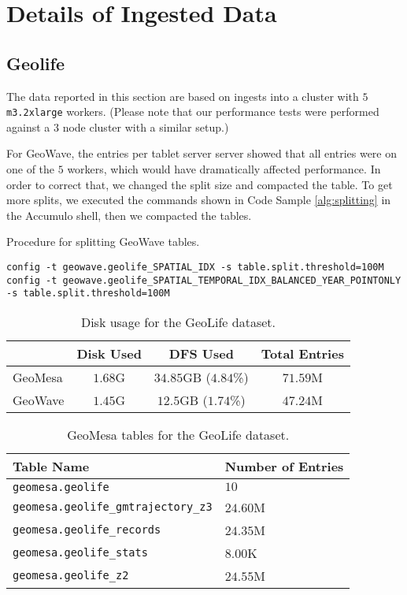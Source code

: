 \section{Details of Ingested Data}
\label{appendix:data}

\subsection{Geolife}

The data reported in this section are based on ingests into a cluster with $5$ \texttt{m3.2xlarge} workers.
(Please note that our performance tests were performed against a $3$ node cluster with a similar setup.)

For GeoWave, the entries per tablet server server showed that all entries were on one of the $5$ workers, which would have dramatically affected performance.
In order to correct that, we changed the split size and compacted the table.
To get more splits, we executed the commands shown in Code Sample \ref{alg:splitting} in the Accumulo shell, then we compacted the tables.

\begin{algorithm}[htb]
\caption{Procedure for splitting GeoWave tables.}\label{alg:splitting}
{\footnotesize\begin{lstlisting}
config -t geowave.geolife_SPATIAL_IDX -s table.split.threshold=100M
config -t geowave.geolife_SPATIAL_TEMPORAL_IDX_BALANCED_YEAR_POINTONLY -s table.split.threshold=100M
\end{lstlisting}}
\end{algorithm}

\begin{table}[h!tb]
  \centering
  \begin{tabular}{ | l || c | c | c | }
    \hline
    & Disk Used & DFS Used & Total Entries \\
    \hline
    GeoMesa & $1.68$G & $34.85$GB ($4.84$\%) & $71.59$M \\
    GeoWave & $1.45$G & $12.5$GB ($1.74$\%) & $47.24$M \\
    \hline
  \end{tabular}
  \caption{Disk usage for the GeoLife dataset.}
  \label{table:geolife:disk}
\end{table}

\begin{table}[h!tb]
  \centering
  \begin{tabular}{ | l | l | }
    \hline
    Table Name & Number of Entries \\
    \hline
    \texttt{geomesa.geolife} & $10$ \\
    \texttt{geomesa.geolife\_gmtrajectory\_z3} & $24.60$M \\
    \texttt{geomesa.geolife\_records} & $24.35$M \\
    \texttt{geomesa.geolife\_stats} & $8.00$K \\
    \texttt{geomesa.geolife\_z2} & $24.55$M \\
    \hline
  \end{tabular}
  \caption{GeoMesa tables for the GeoLife dataset.}
  \label{table:geolife:geomesa:tables}
\end{table}

